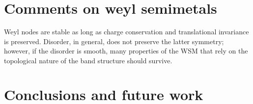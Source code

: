 \documentclass[preprint,pre,floats,aps,amsmath,amssymb]{revtex4}
\begin{document}
\section{Comments on weyl semimetals}

Weyl nodes are stable as long as charge conservation and translational invariance is preserved. Disorder, in general, does not preserve the latter symmetry; however, if the disorder is smooth, many properties of the WSM that rely on the topological nature of the band structure should survive.

 
\section{Conclusions and future work}
\label{sec:conclusion}




{}

\end{document}
